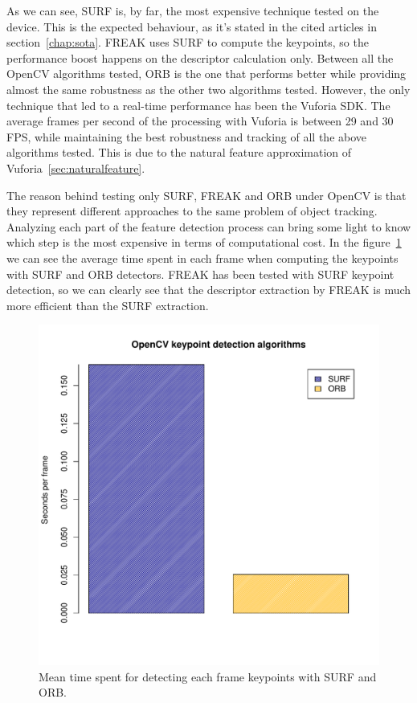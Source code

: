 As we can see, SURF is, by far, the most expensive technique tested on the device. This is the
expected behaviour, as it's stated in the cited articles in
section~\ref{chap:sota}. FREAK uses SURF to compute 
the keypoints, so the performance boost happens on the descriptor calculation
only. Between all the OpenCV algorithms tested, ORB is the one that performs better
while providing almost the same robustness as the other two algorithms tested.
However, the only technique that led to a real-time performance has been the Vuforia
SDK. The average frames per second of the processing with Vuforia is between 29 and
30 FPS, while maintaining the best robustness and tracking of all the above
algorithms tested. This is due to the natural feature
approximation of Vuforia~\ref{sec:naturalfeature}.

The reason behind testing only SURF, FREAK and ORB under OpenCV is that they
represent different approaches to the same problem of object tracking. Analyzing
each part of the feature detection process can bring some light to know which step
is the most expensive in terms of computational cost. In the
figure~\ref{fig:kpperformance} we can see the average time spent in each frame when
computing the keypoints with SURF and ORB detectors. FREAK has been tested with SURF
keypoint detection, so we can clearly see that the descriptor extraction by FREAK is
much more efficient than the SURF extraction.

\begin{figure}
\centering
\includegraphics[scale=0.75]{performance/keypoints.pdf}
\caption{\label{fig:kpperformance} Mean time spent for detecting each frame
  keypoints with SURF and ORB.}
\end{figure} 


